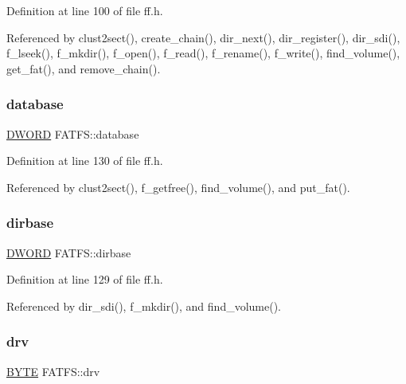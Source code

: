 Definition at line 100 of file ff.\+h.



Referenced by clust2sect(), create\+\_\+chain(), dir\+\_\+next(), dir\+\_\+register(), dir\+\_\+sdi(), f\+\_\+lseek(), f\+\_\+mkdir(), f\+\_\+open(), f\+\_\+read(), f\+\_\+rename(), f\+\_\+write(), find\+\_\+volume(), get\+\_\+fat(), and remove\+\_\+chain().

\mbox{\label{structFATFS_a5b6c0bc2e9fd2ae8ef714210a74a2d5d}} 
\subsubsection{\texorpdfstring{database}{database}}
{\footnotesize\ttfamily \hyperlink{integer_8h_ad342ac907eb044443153a22f964bf0af}{D\+W\+O\+RD} F\+A\+T\+F\+S\+::database}



Definition at line 130 of file ff.\+h.



Referenced by clust2sect(), f\+\_\+getfree(), find\+\_\+volume(), and put\+\_\+fat().

\mbox{\label{structFATFS_a3f72fd998dbcce4652a85a81fe944bc4}} 
\subsubsection{\texorpdfstring{dirbase}{dirbase}}
{\footnotesize\ttfamily \hyperlink{integer_8h_ad342ac907eb044443153a22f964bf0af}{D\+W\+O\+RD} F\+A\+T\+F\+S\+::dirbase}



Definition at line 129 of file ff.\+h.



Referenced by dir\+\_\+sdi(), f\+\_\+mkdir(), and find\+\_\+volume().

\mbox{\label{structFATFS_a6a791560e2687e8b1569bfce61208d2d}} 
\subsubsection{\texorpdfstring{drv}{drv}}
{\footnotesize\ttfamily \hyperlink{lz4_8c_a4ae1dab0fb4b072a66584546209e7d58}{B\+Y\+TE} F\+A\+T\+F\+S\+::drv}



